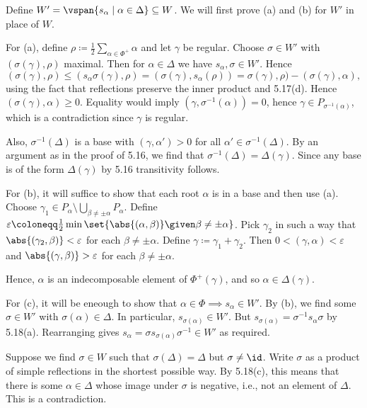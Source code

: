 Define $W' = \vspan{s_\alpha\mid \alpha \in \Delta} \subseteq W$.
We will first prove (a) and (b) for  $W'$ in place of $W$.

For (a), define $\rho\coloneqq \frac{1}{2}\sum_{\alpha \in \Phi^+}\alpha$ and
let $\gamma$ be regular. Choose $\sigma \in W'$ with
$(\sigma(\gamma), \rho)$ maximal. Then for $\alpha \in \Delta$ we have
$s_\alpha, \sigma \in W'$. Hence
\[ (\sigma(\gamma), \rho)\leq (s_\alpha\sigma(\gamma), \rho) = (\sigma(\gamma), s_\alpha(\rho)) = \sigma(\gamma), \rho) - (\sigma(\gamma), \alpha), \]
using the fact that reflections preserve the inner product and 5.17(d).
Hence $(\sigma(\gamma),\alpha)\geq 0$. Equality would imply $(\gamma, \sigma^{-1}(\alpha)) = 0$,
hence $\gamma \in P_{\sigma^{-1}(\alpha)}$, which is a contradiction since
$\gamma$ is regular.

Also, $\sigma^{-1}(\Delta)$ is a base with $(\gamma, \alpha')> 0$ for all
$\alpha' \in \sigma^{-1}(\Delta)$.
By an argument as in the proof of 5.16, we find that
$\sigma^{-1}(\Delta) = \Delta(\gamma)$.
Since any base is of the form $\Delta(\gamma)$ by 5.16 transitivity follows.

For (b), it will suffice to show that each root $\alpha$ is in a base
and then use (a). Choose  $\gamma_1 \in P_\alpha \setminus \bigcup_{\beta\neq \pm\alpha} P_\alpha$.
Define $\varepsilon\coloneqq \frac{1}{2}\min \set{\abs{(\alpha, \beta)}\given \beta\neq \pm\alpha}$.
Pick $\gamma_2$ in such a way that  $\abs{(\gamma_2, \beta)}<\varepsilon$ for
each $\beta \neq \pm\alpha$. Define $\gamma \coloneqq \gamma_1+\gamma_2$.
Then $0 < (\gamma, \alpha) < \varepsilon$ and $\abs{(\gamma, \beta)}>\varepsilon$
for each $\beta\neq\pm\alpha$.

Hence, $\alpha$ is an indecomposable element of $\Phi^+(\gamma)$, and so
$\alpha \in \Delta(\gamma)$.

For (c), it will be eneough to show that $\alpha \in \Phi\implies s_\alpha \in W'$.
By (b), we find some $\sigma \in W'$ with $\sigma(\alpha) \in \Delta$.
In particular, $s_{\sigma(\alpha)} \in W'$. But
$s_{\sigma(\alpha)} = \sigma^{-1}s_\alpha\sigma$ by 5.18(a). Rearranging
gives $s_\alpha = \sigma s_{\sigma(\alpha)}\sigma^{-1} \in W'$ as required.

Suppose we find $\sigma \in W$ such that $\sigma(\Delta) = \Delta$ but
$\sigma\neq\id$. Write $\sigma$ as a product of simple reflections in the shortest
possible way. By 5.18(c), this means that there is some $\alpha \in \Delta$
whose image under $\sigma$ is negative, i.e., not an element of $\Delta$.
This is a contradiction.
